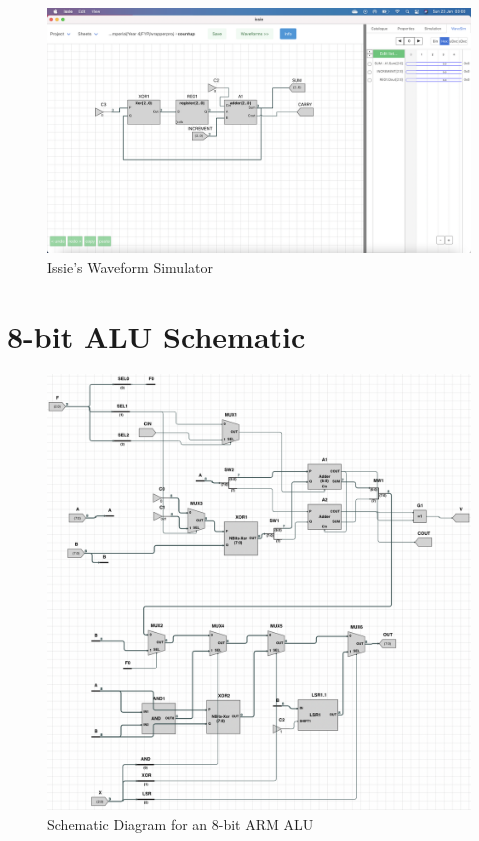 \begin{figure} [h]
    \centering
    \includegraphics[width=\textwidth]{Appendices/IssieWaveSim.png}
    \caption{Issie's Waveform Simulator}
    \label{fig:IssieWS}
\end{figure}


\chapter{8-bit ALU Schematic} \label{app:alu}
\begin{figure}
    \centering
    \includegraphics[width=\textwidth]{Appendices/alu8bit.png}
    \caption{Schematic Diagram for an 8-bit ARM ALU}
    \label{fig:alu8bit}
\end{figure}
